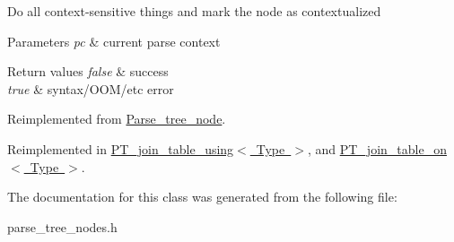 Do all context-\/sensitive things and mark the node as contextualized


\begin{DoxyParams}{Parameters}
{\em pc} & current parse context\\
\hline
\end{DoxyParams}

\begin{DoxyRetVals}{Return values}
{\em false} & success \\
\hline
{\em true} & syntax/\+O\+O\+M/etc error \\
\hline
\end{DoxyRetVals}


Reimplemented from \mbox{\hyperlink{classParse__tree__node_a22d93524a537d0df652d7efa144f23da}{Parse\+\_\+tree\+\_\+node}}.



Reimplemented in \mbox{\hyperlink{classPT__join__table__using_a08c0a676d559eff0da223764a8f127f2}{P\+T\+\_\+join\+\_\+table\+\_\+using$<$ Type $>$}}, and \mbox{\hyperlink{classPT__join__table__on_a5d8bc49cbc77e4bd9c7ea3ae05c624dd}{P\+T\+\_\+join\+\_\+table\+\_\+on$<$ Type $>$}}.



The documentation for this class was generated from the following file\+:\begin{DoxyCompactItemize}
\item 
parse\+\_\+tree\+\_\+nodes.\+h\end{DoxyCompactItemize}
